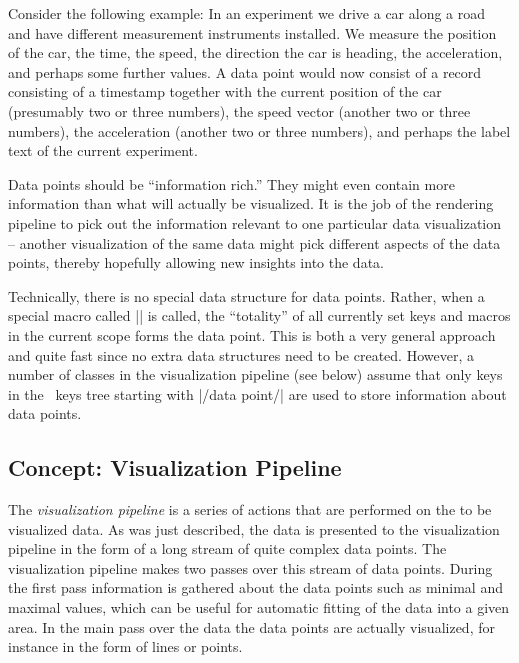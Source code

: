 Consider the following example: In an experiment we drive a car along
a road and have different measurement instruments installed. We
measure the position of the car, the time, the speed, the direction
the car is heading, the acceleration, and perhaps some further
values. A data point would now consist of a record consisting of a
timestamp together with the current position of the car (presumably
two or three numbers), the speed vector (another two or three
numbers), the acceleration (another two or three numbers), and perhaps
the label text of the current experiment. 

Data points should be ``information rich.'' They might even contain
more information than what will actually be visualized. It is the job
of the rendering pipeline to pick out the information relevant to one
particular data visualization -- another visualization of the same
data might pick different aspects of the data points, thereby
hopefully allowing new insights into the data.

Technically, there is no special data structure for data
points. Rather, when a special macro called |\pgfdatapoint| is called,
the ``totality'' of all currently set keys and macros in the current
scope forms the data point. This is both a very general approach and
quite fast since no extra data structures need to be created. However,
a number of classes in the visualization pipeline (see below) assume
that only keys in the \pgfname\ keys tree starting with |/data point/|
are used to store information about data points. 


\subsection{Concept: Visualization Pipeline}

The \emph{visualization pipeline} is a series of actions that are
performed on the to be visualized data. As was just described, the
data is presented to the visualization pipeline in the form of a long
stream of quite complex data points. The visualization pipeline makes
two passes over this stream of data points. During the first pass
information is gathered about the data points such as minimal and
maximal values, which can be useful for automatic fitting of the data
into a given area. In the main pass over the data the data points are
actually visualized, for instance in the form of lines or points.

